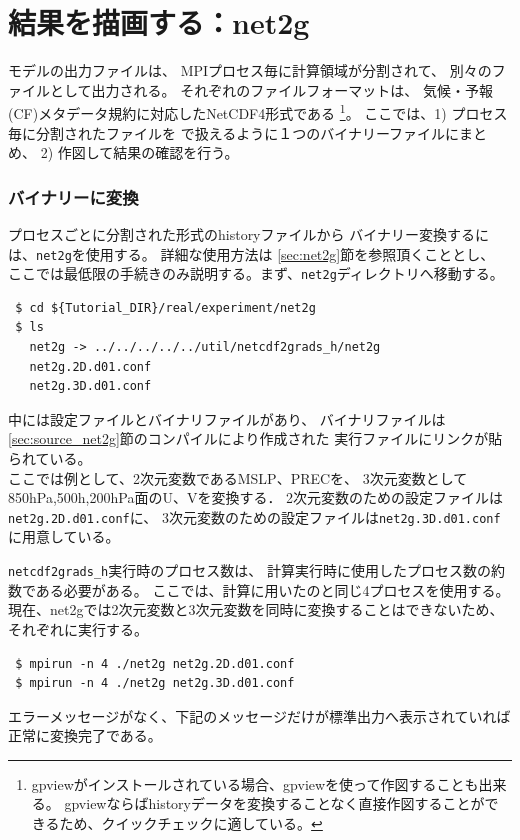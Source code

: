 \section{結果を描画する：net2g} \label{sec:quicklook}

\scalerm モデルの出力ファイルは、
MPIプロセス毎に計算領域が分割されて、
別々のファイルとして出力される。
それぞれのファイルフォーマットは、
気候・予報(CF)メタデータ規約に対応したNetCDF4形式である
\footnote{gpviewがインストールされている場合、gpviewを使って作図することも出来る。
gpviewならばhistoryデータを変換することなく直接作図することができるため、クイックチェックに適している。}。
ここでは、1) プロセス毎に分割された{\netcdf}ファイルを
{\grads}で扱えるように１つのバイナリーファイルにまとめ、
2) 作図して結果の確認を行う。

\subsubsection{{\grads}バイナリーに変換}
プロセスごとに分割された{\netcdf}形式のhistoryファイルから
{\grads}バイナリー変換するには、\verb|net2g|を使用する。
詳細な使用方法は \ref{sec:net2g}節を参照頂くこととし、
ここでは最低限の手続きのみ説明する。まず、\verb|net2g|ディレクトリへ移動する。
\begin{verbatim}
 $ cd ${Tutorial_DIR}/real/experiment/net2g
 $ ls 
   net2g -> ../../../../../util/netcdf2grads_h/net2g
   net2g.2D.d01.conf
   net2g.3D.d01.conf
\end{verbatim}
中には設定ファイルとバイナリファイルがあり、
バイナリファイルは\ref{sec:source_net2g}節のコンパイルにより作成された
実行ファイルにリンクが貼られている。\\

ここでは例として、2次元変数であるMSLP、PRECを、
3次元変数として850hPa,500h,200hPa面のU、Vを変換する．
2次元変数のための設定ファイルは\verb|net2g.2D.d01.conf|に、
3次元変数のための設定ファイルは\verb|net2g.3D.d01.conf|に用意している。

\verb|netcdf2grads_h|実行時のプロセス数は、
計算実行時に使用したプロセス数の約数である必要がある。
ここでは、計算に用いたのと同じ4プロセスを使用する。
現在、net2gでは2次元変数と3次元変数を同時に変換することはできないため、
それぞれに実行する。
\begin{verbatim}
 $ mpirun -n 4 ./net2g net2g.2D.d01.conf
 $ mpirun -n 4 ./net2g net2g.3D.d01.conf
\end{verbatim}
エラーメッセージがなく、下記のメッセージだけが標準出力へ表示されていれば正常に変換完了である。\\

